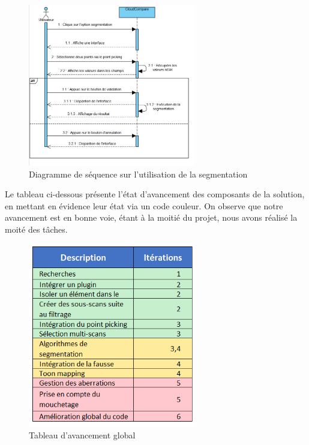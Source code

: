 \documentclass[12pt,titlepage,french]{article}
\begin{document}
\begin{figure}[!hbtp]
\center
  \includegraphics[width=0.65\textwidth]{./img/sequDiagrSegmentation.PNG}
  \caption{\label{} Diagramme de séquence sur l'utilisation de la segmentation}
\end{figure}

Le tableau ci-dessous présente l'état d'avancement des composants de la solution, en mettant en évidence leur état via un code couleur. On observe que notre avancement est en bonne voie, étant à la moitié du projet, nous avons réalisé la moité des tâches.

\begin{figure}[!hbtp]
\center \includegraphics[width=0.65\textwidth]{./img/avancement.png}
  \caption{\label{} Tableau d'avancement global}
\end{figure}

\newpage
\end{document}
